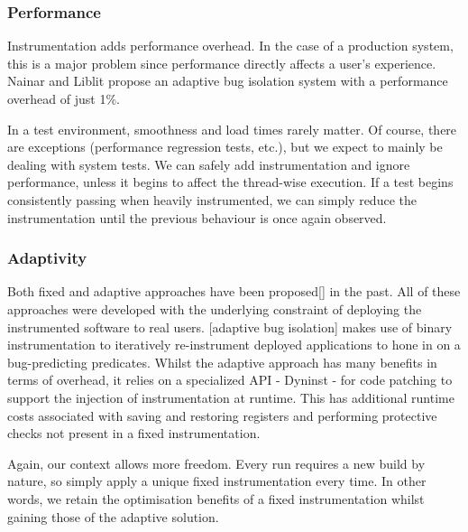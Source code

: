 \subsubsection{Performance}

Instrumentation adds performance overhead. In the case of a production system, this is a major problem since performance directly affects a user’s experience. Nainar and Liblit \cite{ArumugaNainar:2010:ABI:1806799.1806839} propose an adaptive bug isolation system with a performance overhead of just 1\%.

In a test environment, smoothness and load times rarely matter. Of course, there are exceptions (performance regression tests, etc.), but we expect to mainly be dealing with system tests. We can safely add instrumentation and ignore performance, unless it begins to affect the thread-wise execution. If a \flaky{} test begins consistently passing when heavily instrumented, we can simply reduce the instrumentation until the previous \flaky{} behaviour is once again observed.

\subsubsection{Adaptivity}

Both fixed and adaptive approaches have been proposed[] in the past. All of these approaches were developed with the underlying constraint of deploying the instrumented software to real users. [adaptive bug isolation] makes use of binary instrumentation to iteratively re-instrument deployed applications to hone in on a bug-predicting predicates. Whilst the adaptive approach has many benefits in terms of overhead, it relies on a specialized API - Dyninst - for code patching to support the injection of  instrumentation at runtime. This has additional runtime costs \cite{DyninstGuide} associated with saving and restoring registers and performing protective checks not present in a fixed instrumentation.

Again, our context allows more freedom. Every run requires a new build by nature, so simply apply a unique fixed instrumentation every time. In other words, we retain the optimisation benefits of a fixed instrumentation whilst gaining those of the adaptive solution.
